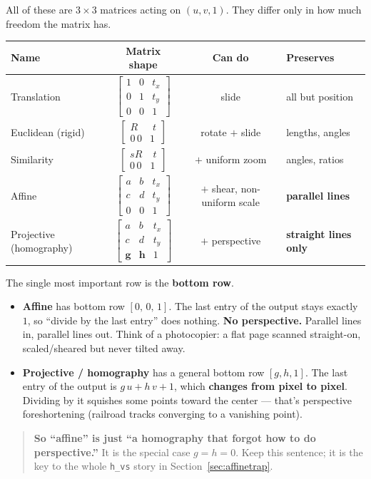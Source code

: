 \documentclass[11pt]{article}
\newcommand{\sm}[1]{\left[\begin{smallmatrix}#1\end{smallmatrix}\right]}
\begin{document}
All of these are $3\times3$ matrices acting on $(u,v,1)$. They differ only in
how much freedom the matrix has.

\begin{center}
\renewcommand{\arraystretch}{1.6}
\begin{tabular}{@{}lccl@{}}
\toprule
Name & Matrix shape & Can do & Preserves \\
\midrule
Translation & $\sm{1&0&t_x\\0&1&t_y\\0&0&1}$ & slide & all but position \\
Euclidean (rigid) & $\sm{R&\;t\\0\,0&1}$ & rotate $+$ slide & lengths, angles \\
Similarity & $\sm{sR&\;t\\0\,0&1}$ & $+$ uniform zoom & angles, ratios \\
Affine & $\sm{a&b&t_x\\c&d&t_y\\0&0&1}$ & $+$ shear, non-uniform scale & \textbf{parallel lines} \\
Projective (homography) & $\sm{a&b&t_x\\c&d&t_y\\ \mathbf{g}&\mathbf{h}&1}$ & $+$ perspective & \textbf{straight lines only} \\
\bottomrule
\end{tabular}
\end{center}

The single most important row is the \textbf{bottom row}.

\begin{itemize}
\item \textbf{Affine} has bottom row $[0,\,0,\,1]$. The last entry of the output
stays exactly $1$, so ``divide by the last entry'' does nothing.
\textbf{No perspective.} Parallel lines in, parallel lines out. Think of a
photocopier: a flat page scanned straight-on, scaled/sheared but never tilted
away.
\item \textbf{Projective / homography} has a general bottom row $[g,h,1]$. The
last entry of the output is $g\,u+h\,v+1$, which \textbf{changes from pixel to
pixel}. Dividing by it squishes some points toward the center --- that's
perspective foreshortening (railroad tracks converging to a vanishing point).
\end{itemize}

\begin{quote}
\textbf{So ``affine'' is just ``a homography that forgot how to do
perspective.''} It is the special case $g=h=0$. Keep this sentence; it is the
key to the whole \texttt{h\_vs} story in Section~\ref{sec:affinetrap}.
\end{quote}
\end{document}
